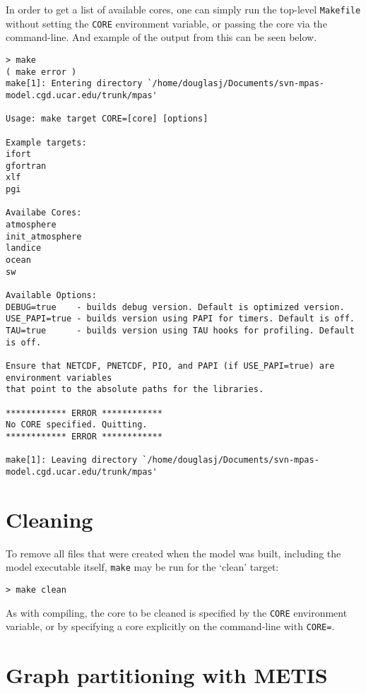 In order to get a list of available cores, one can simply run the top-level {\tt Makefile} without setting the {\tt CORE} environment variable, or passing the core via the command-line. And example of the output from this can be seen below.

{\small
\begin{verbatim}
> make
( make error )
make[1]: Entering directory `/home/douglasj/Documents/svn-mpas-model.cgd.ucar.edu/trunk/mpas'

Usage: make target CORE=[core] [options]

Example targets:
ifort
gfortran
xlf
pgi

Availabe Cores:
atmosphere
init_atmosphere
landice
ocean
sw

Available Options:
DEBUG=true    - builds debug version. Default is optimized version.
USE_PAPI=true - builds version using PAPI for timers. Default is off.
TAU=true      - builds version using TAU hooks for profiling. Default is off.

Ensure that NETCDF, PNETCDF, PIO, and PAPI (if USE_PAPI=true) are environment variables
that point to the absolute paths for the libraries.

************ ERROR ************
No CORE specified. Quitting.
************ ERROR ************

make[1]: Leaving directory `/home/douglasj/Documents/svn-mpas-model.cgd.ucar.edu/trunk/mpas'
\end{verbatim}
}

\section{Cleaning}

To remove all files  that were created when the model was built, including the model executable itself, {\tt make} may
be run for the `clean' target:

\vspace{12pt}
{\tt > make clean}
\vspace{12pt}

As with compiling, the core to be cleaned is specified by the {\tt CORE} environment variable, or by specifying a core explicitly on the command-line with {\tt CORE=}.


\section{Graph partitioning with METIS} 
\label{sec:metis}


